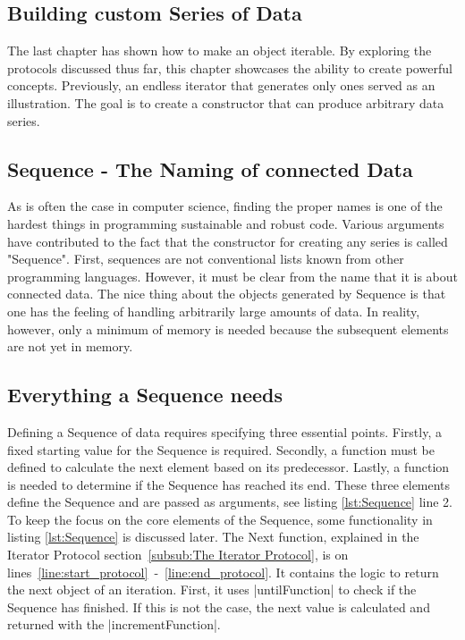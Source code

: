 \subsection{Building custom Series of Data}
\label{sub:Building custom Series of Data}
The last chapter has shown how to make an object iterable. By exploring the 
protocols discussed thus far, this chapter showcases the ability to create 
powerful concepts. Previously, an endless iterator that generates only ones 
served as an illustration. The goal is to create a constructor that can 
produce arbitrary data series.

\subsection{Sequence - The Naming of connected Data}
\label{sub:Sequence - The Naming of connected Data}
As is often the case in computer science, finding the proper names is one of 
the hardest things in programming sustainable and robust code. Various arguments 
have contributed to the fact that the constructor for creating any series is 
called "Sequence". First, sequences are not conventional lists known from other 
programming languages. However, it must be clear from the name that it is about 
connected data. The nice thing about the objects generated by Sequence is that 
one has the feeling of handling arbitrarily large amounts of data. In reality, 
however, only a minimum of memory is needed because the subsequent elements are 
not yet in memory.

\subsection{Everything a Sequence needs}
\label{sub:Everything a Sequence needs}
Defining a Sequence of data requires specifying three essential points.
Firstly, a fixed starting value for the Sequence is required. Secondly, a 
function must be defined to calculate the next element based on its predecessor. 
Lastly, a function is needed to determine if the Sequence has reached its end.
These three elements define the Sequence and are passed as arguments, 
see listing \ref{lst:Sequence} line 2.
To keep the focus on the core elements of the Sequence, some functionality in 
listing \ref{lst:Sequence} is discussed later. The Next function, explained in 
the Iterator Protocol section~\ref{subsub:The Iterator Protocol}, 
is on lines~\ref{line:start_protocol}~-~\ref{line:end_protocol}. It contains the 
logic to return the next object of an iteration. First, it uses |untilFunction| 
to check if the Sequence has finished. If this is not the case, the next value 
is calculated and returned with the |incrementFunction|.

